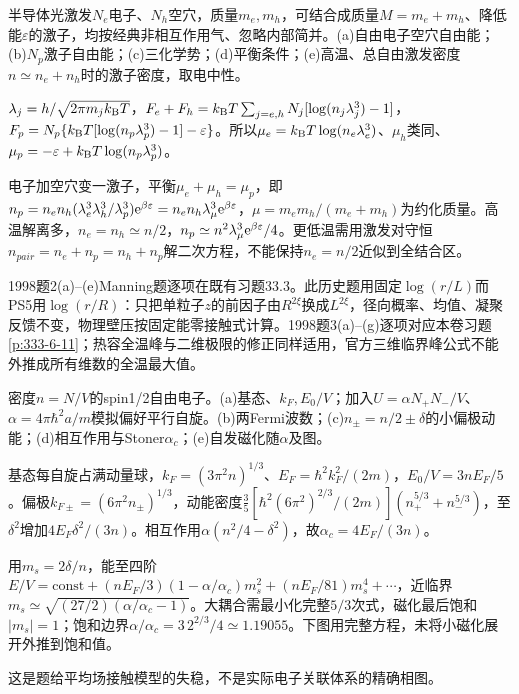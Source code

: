 \begin{exercise}[1998题1(a)--(e)]\label{f:333-1998-1}
半导体光激发$N_e$电子、$N_h$空穴，质量$m_e,m_h$，可结合成质量$M=m_e+m_h$、降低能$\varepsilon$的激子，均按经典非相互作用气、忽略内部简并。(a)自由电子空穴自由能；(b)$N_p$激子自由能；(c)三化学势；(d)平衡条件；(e)高温、总自由激发密度$n\simeq n_e+n_h$时的激子密度，取电中性。
\end{exercise}
\begin{solution}
$\lambda_j=h/\sqrt{2\pi m_jk_{\mathrm B} T}$，$F_e+F_h=k_{\mathrm B} T\sum_{j=e,h}N_j[\log(n_j\lambda_j^3)-1]$，$F_p=N_p\{k_{\mathrm B} T[\log(n_p\lambda_p^3)-1]-\varepsilon\}$。所以$\mu_e=k_{\mathrm B} T\log(n_e\lambda_e^3)$、$\mu_h$类同、$\mu_p=-\varepsilon+k_{\mathrm B} T\log(n_p\lambda_p^3)$。

电子加空穴变一激子，平衡$\mu_e+\mu_h=\mu_p$，即$n_p=n_en_h(\lambda_e^3\lambda_h^3/\lambda_p^3)\mathrm e^{\beta\varepsilon}=n_en_h\lambda_\mu^3\mathrm e^{\beta\varepsilon}$，$\mu=m_em_h/(m_e+m_h)$为约化质量。高温解离多，$n_e=n_h\simeq n/2$，$n_p\simeq n^2\lambda_\mu^3\mathrm e^{\beta\varepsilon}/4$。更低温需用激发对守恒$n_{pair}=n_e+n_p=n_h+n_p$解二次方程，不能保持$n_e=n/2$近似到全结合区。
\end{solution}
1998题2(a)--(e)Manning题逐项在既有习题33.3。此历史题用固定$\log(r/L)$而PS5用$\log(r/R)$：只把单粒子$z$的前因子由$R^{2\xi}$换成$L^{2\xi}$，径向概率、均值、凝聚反馈不变，物理壁压按固定能零接触式计算。1998题3(a)--(g)逐项对应本卷习题\ref{p:333-6-11}；热容全温峰与二维极限的修正同样适用，官方三维临界峰公式不能外推成所有维数的全温最大值。
\begin{exercise}[1999题1(a)--(e)]\label{f:333-1999-1}
密度$n=N/V$的spin1/2自由电子。(a)基态、$k_F,E_0/V$；加入$U=\alpha N_+N_-/V$、$\alpha=4\pi\hbar^2a/m$模拟偏好平行自旋。(b)两Fermi波数；(c)$n_\pm=n/2\pm\delta$的小偏极动能；(d)相互作用与Stoner$\alpha_c$；(e)自发磁化随$\alpha$及图。
\end{exercise}
\begin{solution}
基态每自旋占满动量球，$k_F=(3\pi^2n)^{1/3}$、$E_F=\hbar^2k_F^2/(2m)$，$E_0/V=3nE_F/5$。偏极$k_{F\pm}=(6\pi^2n_\pm)^{1/3}$，动能密度$\tfrac35[\hbar^2(6\pi^2)^{2/3}/(2m)](n_+^{5/3}+n_-^{5/3})$，至$\delta^2$增加$4E_F\delta^2/(3n)$。相互作用$\alpha(n^2/4-\delta^2)$，故$\alpha_c=4E_F/(3n)$。

用$m_s=2\delta/n$，能至四阶$E/V=\mathrm{const}+(nE_F/3)(1-\alpha/\alpha_c)m_s^2+(nE_F/81)m_s^4+\cdots$，近临界$m_s\simeq\sqrt{(27/2)(\alpha/\alpha_c-1)}$。大耦合需最小化完整$5/3$次式，磁化最后饱和$|m_s|=1$；饱和边界$\alpha/\alpha_c=3\,2^{2/3}/4\simeq1.19055$。下图用完整方程，未将小磁化展开外推到饱和值。

这是题给平均场接触模型的失稳，不是实际电子关联体系的精确相图。
\end{solution}
